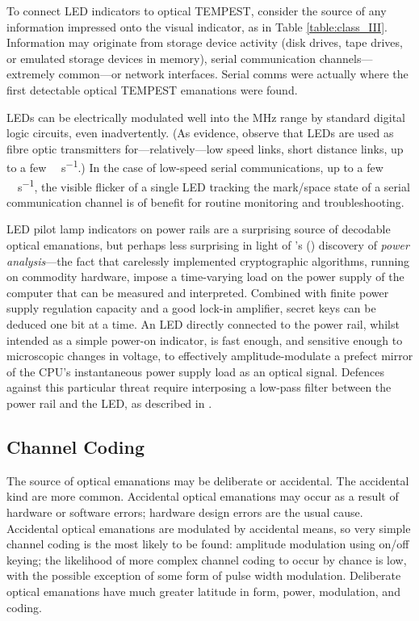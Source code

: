 \documentclass[a4paper,twoside,11pt,openany]{book}
\begin{document}
To connect LED indicators to optical TEMPEST, consider the source of any
information impressed onto the visual indicator, as in Table
\ref{table:class_III}. Information may originate from storage device activity
(disk drives, tape drives, or emulated storage devices in memory), serial
communication channels---extremely common---or network interfaces. Serial comms
were actually where the first detectable optical TEMPEST emanations were found.

LEDs can be electrically modulated well into the \si{\mega\hertz} range by
standard digital logic circuits, even inadvertently. (As evidence, observe that
LEDs are used as fibre optic transmitters for---relatively---low speed links,
short distance links, up to a few \si{\mega\bit\per\second}.) In the case of
low-speed serial communications, up to a few \si{\kilo\bit\per\second}, the
visible flicker of a single LED tracking the mark/space state of a serial
communication channel is of benefit for routine monitoring and troubleshooting.

LED pilot lamp indicators on power rails are a surprising source of decodable
optical emanations, but perhaps less surprising in light of
\citeauthor{Kocher1999}'s (\citeyear{Kocher1999}) discovery of \emph{power
analysis}---the fact that carelessly implemented cryptographic algorithms,
running on commodity hardware, impose a time-varying load on the power supply
of the computer that can be measured and interpreted. Combined with finite
power supply regulation capacity and a good lock-in amplifier, secret keys can
be deduced one bit at a time. An LED directly connected to the power rail,
whilst intended as a simple power-on indicator, is fast enough, and sensitive
enough to microscopic changes in voltage, to effectively amplitude-modulate a
prefect mirror of the CPU's instantaneous power supply load as an optical
signal. Defences against this particular threat require interposing a low-pass
filter between the power rail and the LED, as described in \cite{Loughry2006a}.

\subsection{Channel Coding}

The source of optical emanations may be deliberate or accidental. The
accidental kind are more common. Accidental optical emanations may occur as a
result of hardware or software errors; hardware design errors are the usual
cause. Accidental optical emanations are modulated by accidental means, so very
simple channel coding is the most likely to be found: amplitude modulation
using on/off keying; the likelihood of more complex channel coding to occur by
chance is low, with the possible exception of some form of pulse width
modulation. Deliberate optical emanations have much greater latitude in form,
power, modulation, and coding.
\end{document}
